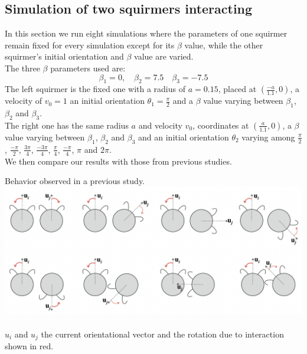 \documentclass{article}
\begin{document}
\subsection{Simulation of two squirmers interacting}
In this section we run eight simulations where the parameters of one squirmer remain fixed for every simulation 
except for its $\beta$ value, while the other squirmer's 
initial orientation and $\beta$ value are varied.\\
The three $\beta$ parameters used are:
\begin{equation*}
   \beta_1 = 0, \quad \beta_2 = 7.5 \quad \beta_3 = -7.5
\end{equation*}
The left squirmer is the fixed one with a radius of $a=0.15$, placed at $(\frac{-a}{1.1}, 0)$, a velocity of $v_0 = 1$
 an initial orientation $\theta_1 = \frac{\pi}{2}$ and a $\beta$ value varying between $\beta_1$, $\beta_2$ and $\beta_3$.\\
The right one has the same radius $a$ and velocity $v_0$, coordinates at $(\frac{a}{1.1}, 0)$,
 a $\beta$ value varying between $\beta_1$, $\beta_2$ and $\beta_3$ and an initial orientation $\theta_2$ varying among
 $\frac{\pi}{2}$, $\frac{-\pi}{2}$, $\frac{3\pi}{4}$, $\frac{-3\pi}{4}$, $\frac{\pi}{4}$, $\frac{-\pi}{4}$, $\pi$ and $2\pi$.\\
We then compare our results with those from previous studies.
\begin{center}
   Behavior observed in a previous study.
   \includegraphics[width=1\textwidth]{Presentation/images/stark_behavior.png}\\
   \cite{Stark}\\
   $u_i$ and $u_j$ the current orientational vector and the rotation due to interaction shown in red.  
\end{center}
\end{document}
